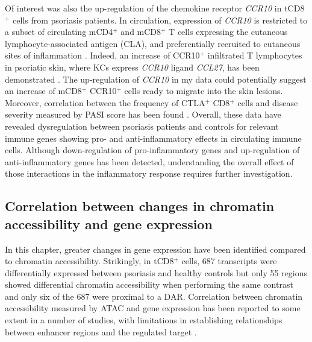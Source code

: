 Of interest was also the up-regulation of the chemokine receptor \textit{CCR10} in tCD8$^+$ cells from psoriasis patients. In circulation, expression of \textit{CCR10} is restricted to a subset of circulating mCD4$^+$ and mCD8$^+$ T cells expressing the cutaneous lymphocyte-associated antigen (CLA), and preferentially recruited to cutaneous sites of inflammation \parencite{Hudak2002}. Indeed, an increase of CCR10$^+$ infiltrated T lymphocytes in psoriatic skin, where KCs express \textit{CCR10} ligand \textit{CCL27}, has been demonstrated \parencite{Homey2002}. The up-regulation of \textit{CCR10} in my data could potentially suggest an increase of mCD8$^+$ CCR10$^+$ cells ready to migrate into the skin lesions. Moreover, correlation between the frequency of CTLA$^+$ CD8$^+$ cells and disease severity measured by PASI score has been found \parencite{Sigmundsdottir2001}. Overall, these data have revealed dysregulation between psoriasis patients and controls for relevant immune genes showing pro- and anti-inflammatory effects in circulating immune cells. Although down-regulation of pro-inflammatory genes and up-regulation of anti-inflammatory genes has been detected, understanding the overall effect of those interactions in the inflammatory response requires further investigation. 




\subsection{Correlation between changes in chromatin accessibility and gene expression}
In this chapter, greater changes in gene expression have been identified compared to chromatin accessibility. Strikingly, in tCD8$^+$ cells, 687 transcripts were differentially expressed between psoriasis and healthy controls but only 55 regions showed differential chromatin accessibility when performing the same contrast and only six of the 687 were proximal to a DAR. Correlation between chromatin accessibility measured by ATAC and gene expression has been reported to some extent in a number of studies, with limitations in establishing relationships between enhancer regions and the regulated target \parencite{Ackermann2016,Wang2018}.

